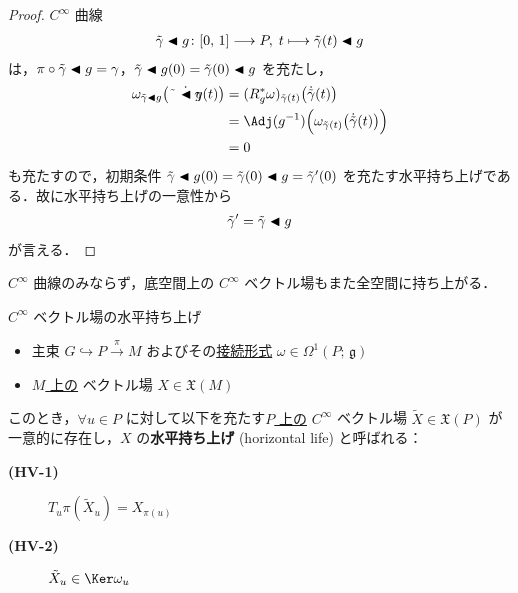 \documentclass[geometry_main]{subfiles}
\begin{document}
\begin{proof}
    $C^\infty$ 曲線
    \begin{align}
        \tilde{\gamma} \blacktriangleleft g \colon [0,\, 1] \longrightarrow P,\; t \longmapsto \tilde{\gamma}(t) \blacktriangleleft g
    \end{align}
    は，$\pi \circ \tilde{\gamma} \blacktriangleleft g = \gamma$，$\tilde{\gamma} \blacktriangleleft g(0) = \tilde{\gamma}(0) \blacktriangleleft g$ を充たし，
    \begin{align}
        \omega_{\tilde{\gamma} \btl g}\bigl(\dot{\tilde{\gamma} \btl g} (t)\bigr)
        &= (R_g^*\omega)_{\tilde{\gamma}(t)} \bigl( \dot{\tilde{\gamma}}(t) \bigr) \\
        &= \Adj(g^{-1}) \Bigl(\omega_{\tilde{\gamma}(t)} \bigl( \dot{\tilde{\gamma}}(t) \bigr)\Bigr) \\
        &= 0
    \end{align}
    も充たすので，初期条件 $\tilde{\gamma} \blacktriangleleft g(0) = \tilde{\gamma}(0) \blacktriangleleft g = \tilde{\gamma}'(0)$ を充たす水平持ち上げである．故に水平持ち上げの一意性から
    \begin{align}
        \tilde{\gamma}' = \tilde{\gamma} \blacktriangleleft g
    \end{align}
    が言える．
\end{proof}


$C^\infty$ 曲線のみならず，底空間上の $C^\infty$ ベクトル場もまた全空間に持ち上がる．

\begin{mydef}[label=def:horizontal-lift-vecf]{$C^\infty$ ベクトル場の水平持ち上げ}
    \begin{itemize}
        \item 主束 $G \hookrightarrow P \xrightarrow{\pi} M$ およびその\hyperref[def:connection]{接続形式} $\omega \in \Omega^1(P;\, \mathfrak{g})$
        \item \underline{$M$ 上の} \cinfty ベクトル場 $X \in \mathfrak{X}(M)$
    \end{itemize}
    このとき，$\forall u \in P$ に対して以下を充たす\underline{$P$ 上の} $C^\infty$ ベクトル場 $\tilde{X} \in \mathfrak{X}(P)$ が一意的に存在し，$X$ の\textbf{水平持ち上げ} (horizontal life) と呼ばれる：
    \begin{description}
        \item[\textbf{(HV-1)}] $T_u \pi (\tilde{X}_u) = X_{\pi(u)}$
        \item[\textbf{(HV-2)}] $\tilde{X}_u \in \Ker \omega_u$
    \end{description}
\end{mydef}
\end{document}
